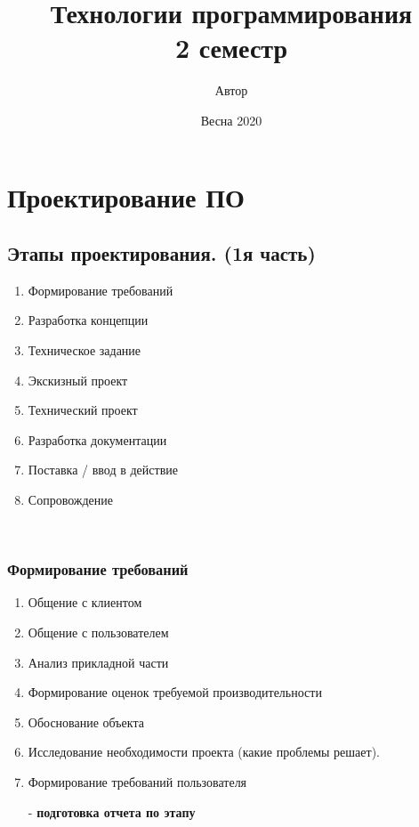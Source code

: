\documentclass[12pt; a4paper]{book}
\begin{document}
 

\frontmatter
\title{Технологии программирования\\ 2 семестр}
\author{Автор} 
\date{Весна 2020}
\maketitle

\tableofcontents

\mainmatter
\chapter{Проектирование ПО}

\section{Этапы проектирования. (1я часть)}
\begin{enumerate}
\item Формирование требований
\item Разработка концепции
\item Техническое задание
\item Экскизный проект
\item Технический проект
\item Разработка документации
\item Поставка / ввод в действие
\item Сопровождение
\end{enumerate}\

\subsection{Формирование требований}
\begin{enumerate}
\item Общение с клиентом
\item Общение с пользователем
\item Анализ прикладной части
\item Формирование оценок требуемой производительности
\item Обоснование объекта
\item Исследование необходимости проекта (какие проблемы решает).
\item Формирование требований пользователя
\item[-] \textbf{подготовка отчета по этапу}
\end{enumerate}
\end{document}
